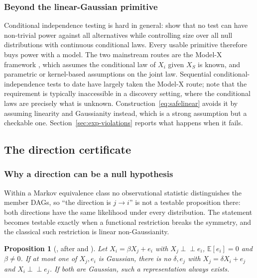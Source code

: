 \documentclass[pdflatex,sn-apa]{sn-jnl}
\theoremstyle{thmstyleone}%
\newtheorem{proposition}[theorem]{Proposition}%
\theoremstyle{thmstyletwo}%
\theoremstyle{thmstylethree}%
\newcommand{\indep}{\perp\!\!\!\perp}
\newcommand{\Exp}{\mathbb{E}}
\begin{document}
\subsubsection{Beyond the linear-Gaussian primitive}\label{sec:beyondlg}

Conditional independence testing is hard in general: \citet{shah2020hardness}
show that no test can have non-trivial power against all alternatives while
controlling size over all null distributions with continuous conditional
laws. Every usable primitive therefore buys power with a model. The two
mainstream routes are the Model-X framework
\citep{candes2018panning}, which assumes the conditional law of $X_i$ given
$X_S$ is known, and parametric or kernel-based assumptions on the joint law.
Sequential conditional-independence tests to date have largely taken the
Model-X route; \citet{csillag2025prediction} note that the requirement is
typically inaccessible in a discovery setting, where the conditional laws are
precisely what is unknown. Construction~\eqref{eq:safelinear} avoids it by
assuming linearity and Gaussianity instead, which is a strong assumption but a
checkable one. Section~\ref{sec:exp-violations} reports what happens when it
fails.

\subsection{The direction certificate}\label{sec:direction}

\subsubsection{Why a direction can be a null hypothesis}\label{sec:whynull}

Within a Markov equivalence class no observational statistic distinguishes the
member DAGs, so ``the direction is $j \to i$'' is not a testable proposition
there: both directions have the same likelihood under every distribution. The
statement becomes testable exactly when a functional restriction breaks the
symmetry, and the classical such restriction is linear non-Gaussianity.

\begin{proposition}[\citealp{shimizu2006linear}, after
\citealp{darmois1953analyse} and \citealp{comon1994independent}]
\label{prop:lingam}
Let $X_i = \beta X_j + e_i$ with $X_j \indep e_i$, $\Exp[e_i] = 0$ and
$\beta \neq 0$. If at most one of $X_j, e_i$ is Gaussian, there is no
$\delta, e_j$ with $X_j = \delta X_i + e_j$ and $X_i \indep e_j$. If both are
Gaussian, such a representation always exists.
\end{proposition}
\end{document}
